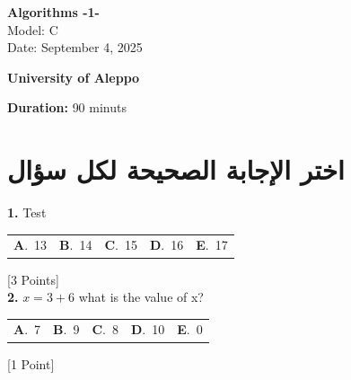 \documentclass[12pt]{article}
\newcommand{\choice}[2]{\textbf{#1}.~#2}
\begin{document}
\begin{flushright}
{\Large \textbf{{\textenglish{Algorithms -1-}}}}\\[0.25em]
{\normalsize \textenglish{Model: }{\textenglish{C}}}\\[0.1em]
{\normalsize \textenglish{Date: }{\textenglish{September 4, 2025}}}
\end{flushright}

\vspace{0.6cm}

\noindent
\begin{minipage}[t]{0.65\textwidth}
  \raggedright
  \textbf{{\textenglish{University of Aleppo}}}\\[0.3em]
\end{minipage}\hfill
\begin{minipage}[t]{0.3\textwidth}
  \raggedleft
  \textenglish{\textbf{Duration: }}{\textenglish{90 minuts}}
\end{minipage}

\vspace{0.9cm}

\section*{اختر الإجابة الصحيحة لكل سؤال}

\noindent \textbf{\textenglish{1.}} {\textenglish{Test}}

\begin{tabularx}{\linewidth}{@{}*{5}{Y}@{}}
\choice{A}{{{\textenglish{13}}}} & \choice{B}{{{\textenglish{14}}}} & \choice{C}{{{\textenglish{15}}}} & \choice{D}{{{\textenglish{16}}}} & \choice{E}{{{\textenglish{17}}}} \\
\end{tabularx}
\hfill {\textenglish{[3 Points]}}\\[0.5em]

\noindent \textbf{\textenglish{2.}} \(x=3+6 \){\textenglish{ what is the value of x?}}

\begin{tabularx}{\linewidth}{@{}*{5}{Y}@{}}
\choice{A}{{{\textenglish{7}}}} & \choice{B}{{{\textenglish{9}}}} & \choice{C}{{{\textenglish{8}}}} & \choice{D}{{{\textenglish{10}}}} & \choice{E}{{{\textenglish{0}}}} \\
\end{tabularx}
\hfill {\textenglish{[1 Point]}}\\[0.5em]
\end{document}
